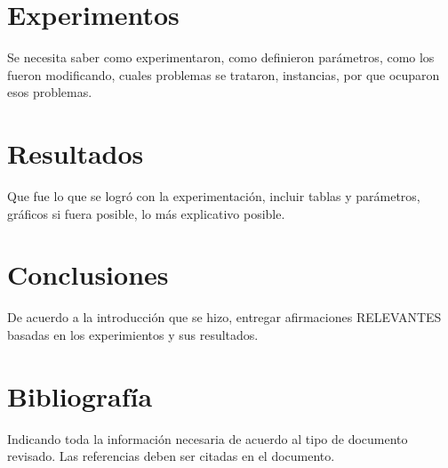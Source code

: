 \documentclass[letter, 10pt]{article}
\begin{document}
\section{Experimentos}
Se necesita saber como experimentaron, como definieron par\'ametros, como los fueron modificando, cuales 
problemas se trataron, instancias, por que ocuparon esos problemas.

\section{Resultados}
Que fue lo que se logr\'o con la experimentaci\'on, incluir tablas y par\'ametros, gr\'aficos si fuera
posible, lo m\'as explicativo posible.

\section{Conclusiones}
De acuerdo a la introducci\'on que se hizo, entregar afirmaciones RELEVANTES basadas en los experimientos
y sus resultados.

\section{Bibliograf\'ia}
Indicando toda la informaci\'on necesaria de acuerdo al tipo de documento revisado. Las referencias deben ser citadas en el documento.


\end{document}
